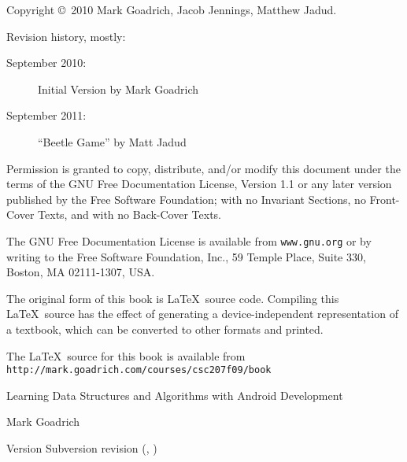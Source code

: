 \documentclass[10pt]{book}
\newcommand{\thetitle}{Learning Data Structures and Algorithms with Android Development}
\newcommand{\theversion}{Subversion revision \svnrev (\svnauthor, \svndate)}
\begin{document}
\begin{latexonly}
\pagebreak
\thispagestyle{empty}

{\small
Copyright \copyright ~2010 Mark Goadrich, Jacob Jennings, Matthew Jadud.

Revision history, mostly:

\begin{description}

\item[September 2010:] Initial Version by Mark Goadrich
\item[September 2011:] ``Beetle Game'' by Matt Jadud

\end{description}

\vspace{0.2in}

Permission is granted to copy, distribute, and/or modify this document
under the terms of the GNU Free Documentation License, Version 1.1 or
any later version published by the Free Software Foundation; with no
Invariant Sections, no Front-Cover Texts, and with no Back-Cover Texts.

The GNU Free Documentation License is available from {\tt www.gnu.org}
or by writing to the Free Software Foundation, Inc., 59 Temple Place,
Suite 330, Boston, MA 02111-1307, USA.

The original form of this book is \LaTeX\ source code.  Compiling this
\LaTeX\ source has the effect of generating a device-independent
representation of a textbook, which can be converted to other formats
and printed.

The \LaTeX\ source for this book is available from
{\tt http://mark.goadrich.com/courses/csc207f09/book}

\vspace{0.2in}

} %

\end{latexonly}



\begin{htmlonly}


{\Huge \thetitle}

{\Large Mark Goadrich}

Version \theversion

\setcounter{chapter}{-1}

\end{htmlonly}
\end{document}
